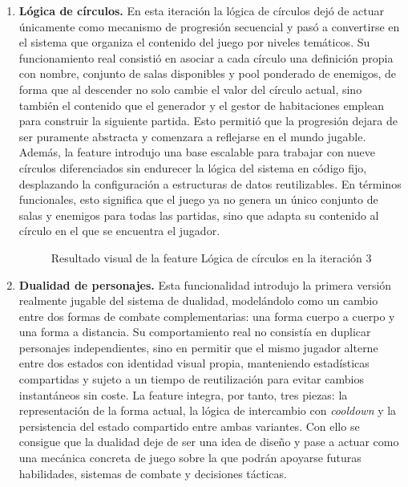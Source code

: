 \begin{enumerate}
\item \textbf{Lógica de círculos.} En esta iteración la lógica de círculos dejó de actuar
únicamente como mecanismo de progresión secuencial y pasó a convertirse en el sistema que
organiza el contenido del juego por niveles temáticos. Su funcionamiento real consistió en
asociar a cada círculo una definición propia con nombre, conjunto de salas disponibles y
pool ponderado de enemigos, de forma que al descender no solo cambie el valor del círculo
actual, sino también el contenido que el generador y el gestor de habitaciones emplean para
construir la siguiente partida. Esto permitió que la progresión dejara de ser puramente
abstracta y comenzara a reflejarse en el mundo jugable. Además, la feature introdujo una
base escalable para trabajar con nueve círculos diferenciados sin endurecer la lógica del
sistema en código fijo, desplazando la configuración a estructuras de datos reutilizables.
En términos funcionales, esto significa que el juego ya no genera un único conjunto de
salas y enemigos para todas las partidas, sino que adapta su contenido al círculo en el que
se encuentra el jugador.

\begin{figure}[H]
\begin{center}
\caption{Resultado visual de la feature Lógica de círculos en la iteración 3}
\label{fig:iteracion3-feature-circulos}
\end{center}
\end{figure}

\item \textbf{Dualidad de personajes.} Esta funcionalidad introdujo la primera versión
realmente jugable del sistema de dualidad, modelándolo como un cambio entre dos formas de
combate complementarias: una forma cuerpo a cuerpo y una forma a distancia. Su
comportamiento real no consistía en duplicar personajes independientes, sino en permitir
que el mismo jugador alterne entre dos estados con identidad visual propia, manteniendo
estadísticas compartidas y sujeto a un tiempo de reutilización para evitar cambios
instantáneos sin coste. La feature integra, por tanto, tres piezas: la representación de la
forma actual, la lógica de intercambio con \textit{cooldown} y la persistencia del estado
compartido entre ambas variantes. Con ello se consigue que la dualidad deje de ser una idea
de diseño y pase a actuar como una mecánica concreta de juego sobre la que podrán apoyarse
futuras habilidades, sistemas de combate y decisiones tácticas.


\end{enumerate}
